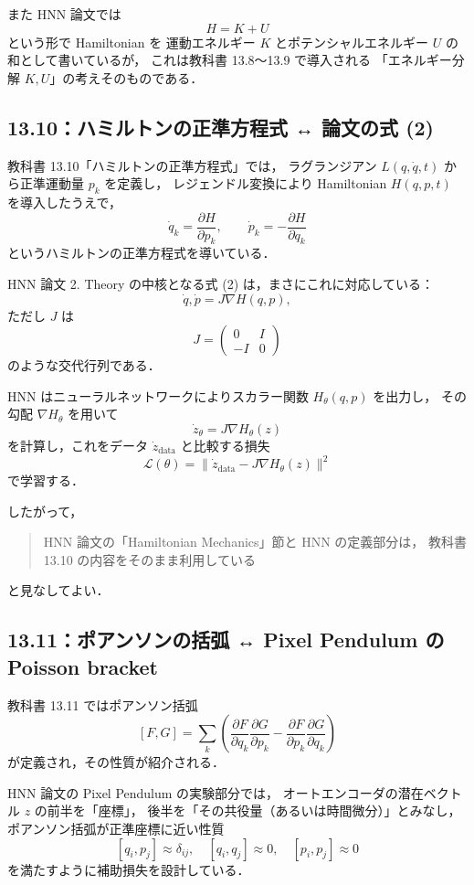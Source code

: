 \documentclass[a4paper,12pt]{jlreq}
\begin{document}
また HNN 論文では
\[
  H = K + U
\]
という形で Hamiltonian を
運動エネルギー \(K\) とポテンシャルエネルギー \(U\) の和として書いているが，
これは教科書 13.8～13.9 で導入される
「エネルギー分解 \(K, U\)」の考えそのものである．

\subsection*{13.10：ハミルトンの正準方程式 ↔ 論文の式 (2)}

教科書 13.10「ハミルトンの正準方程式」では，
ラグランジアン \(L(q,\dot q,t)\) から正準運動量 \(p_k\) を定義し，
レジェンドル変換により Hamiltonian \(H(q,p,t)\) を導入したうえで，
\[
  \dot q_k = \frac{\partial H}{\partial p_k},
  \qquad
  \dot p_k = -\frac{\partial H}{\partial q_k}
\]
というハミルトンの正準方程式を導いている．

HNN 論文 2. Theory の中核となる式 (2) は，まさにこれに対応している：
\[
  \dot{q}, \dot{p} = J \nabla H(q,p),
\]
ただし \(J\) は
\[
  J =
  \begin{pmatrix}
    0 & I \\
    -I & 0
  \end{pmatrix}
\]
のような交代行列である．

HNN はニューラルネットワークによりスカラー関数 \(H_\theta(q,p)\) を出力し，
その勾配 \(\nabla H_\theta\) を用いて
\[
  \dot z_\theta = J \nabla H_\theta(z)
\]
を計算し，これをデータ \(\dot z_{\text{data}}\) と比較する損失
\[
  \mathcal{L}(\theta)
  =
  \bigl\|
    \dot{z}_{\text{data}} - J \nabla H_\theta(z)
  \bigr\|^2
\]
で学習する．

したがって，
\begin{quote}
  HNN 論文の「Hamiltonian Mechanics」節と HNN の定義部分は，
  教科書 13.10 の内容をそのまま利用している
\end{quote}
と見なしてよい．

\subsection*{13.11：ポアンソンの括弧 ↔ Pixel Pendulum の Poisson bracket}

教科書 13.11 ではポアンソン括弧
\[
  [F,G]
  =
  \sum_k \left(
    \frac{\partial F}{\partial q_k}\frac{\partial G}{\partial p_k}
    -
    \frac{\partial F}{\partial p_k}\frac{\partial G}{\partial q_k}
  \right)
\]
が定義され，その性質が紹介される．

HNN 論文の Pixel Pendulum の実験部分では，
オートエンコーダの潜在ベクトル \(z\) の前半を「座標」，
後半を「その共役量（あるいは時間微分）」とみなし，
ポアンソン括弧が正準座標に近い性質
\[
  [q_i,p_j] \approx \delta_{ij},
  \quad
  [q_i,q_j] \approx 0,
  \quad
  [p_i,p_j] \approx 0
\]
を満たすように補助損失を設計している．
\end{document}
